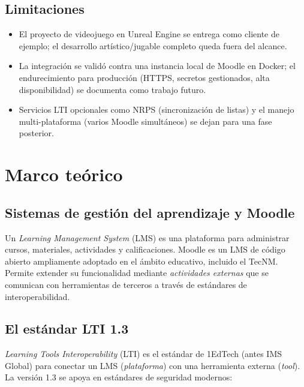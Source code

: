 \documentclass[12pt,letterpaper,oneside]{report}
\begin{document}
\section{Limitaciones}
\begin{itemize}[leftmargin=1.4em]
  \item El proyecto de videojuego en Unreal Engine se entrega como cliente de
  ejemplo; el desarrollo artístico/jugable completo queda fuera del alcance.
  \item La integración se validó contra una instancia local de Moodle en Docker;
  el endurecimiento para producción (HTTPS, secretos gestionados, alta
  disponibilidad) se documenta como trabajo futuro.
  \item Servicios LTI opcionales como NRPS (sincronización de listas) y el manejo
  multi-plataforma (varios Moodle simultáneos) se dejan para una fase posterior.
\end{itemize}

\chapter{Marco teórico}

\section{Sistemas de gestión del aprendizaje y Moodle}
Un \emph{Learning Management System} (LMS) es una plataforma para administrar
cursos, materiales, actividades y calificaciones. Moodle es un LMS de código
abierto ampliamente adoptado en el ámbito educativo, incluido el TecNM. Permite
extender su funcionalidad mediante \emph{actividades externas} que se comunican
con herramientas de terceros a través de estándares de interoperabilidad.

\section{El estándar LTI 1.3}
\emph{Learning Tools Interoperability} (LTI) es el estándar de 1EdTech (antes IMS
Global) para conectar un LMS (\emph{plataforma}) con una herramienta externa
(\emph{tool}). La versión 1.3 se apoya en estándares de seguridad modernos:
\end{document}

